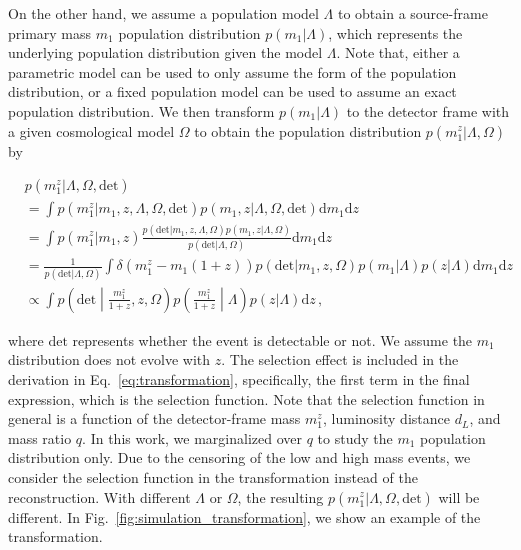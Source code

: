 \documentclass[twocolumn]{aastex631}
\begin{document}
On the other hand, we assume a population model $\Lambda$ to obtain a source-frame primary mass $m_1$ population distribution $p(m_1|\Lambda)$, which represents the underlying population distribution given the model $\Lambda$.
Note that, either a parametric model can be used to only assume the form of the population distribution, or a fixed population model can be used to assume an exact population distribution.
We then transform $p(m_1|\Lambda)$ to the detector frame with a given cosmological model $\Omega$ to obtain the population distribution $p(m^z_1|\Lambda, \Omega)$ by
\begin{widetext}
\begin{equation}
    \begin{aligned}
        &p(m^z_1|\Lambda, \Omega, \mathrm{det}) \\
        &= \int p(m^z_1|m_1, z, \Lambda, \Omega, \mathrm{det}) p(m_1, z|\Lambda, \Omega, \mathrm{det}) \mathrm{d}m_1 \mathrm{d}z \\
        &= \int p(m^z_1|m_1, z) \frac{p(\mathrm{det}|m_1, z, \Lambda, \Omega)p(m_1, z|\Lambda, \Omega)}{p(\mathrm{det}|\Lambda, \Omega)} \mathrm{d}m_1 \mathrm{d}z \\
        &= \frac{1}{p(\mathrm{det}|\Lambda, \Omega)}\int \delta(m^z_1-m_1(1+z))p(\mathrm{det}|m_1, z, \Omega)p(m_1|\Lambda)p(z|\Lambda) \mathrm{d}m_1 \mathrm{d}z \\
        &\propto \int p\left(\mathrm{det}\middle|\frac{m^z_1}{1+z},z,\Omega\right)p\left(\frac{m^z_1}{1+z}\middle|\Lambda\right)p(z|\Lambda) \mathrm{d}z\,,
    \end{aligned}
    \label{eq:transformation}
\end{equation}
\end{widetext}
where $\mathrm{det}$ represents whether the event is detectable or not.
We assume the $m_1$ distribution does not evolve with $z$.
The selection effect is included in the derivation in Eq.~\eqref{eq:transformation}, specifically, the first term in the final expression, which is the selection function.
Note that the selection function in general is a function of the detector-frame mass $m^z_1$, luminosity distance $d_L$, and mass ratio $q$.
In this work, we marginalized over $q$ to study the $m_1$ population distribution only.
Due to the censoring of the low and high mass events, we consider the selection function in the transformation instead of the reconstruction.
With different $\Lambda$ or $\Omega$, the resulting $p(m^z_1|\Lambda, \Omega, \mathrm{det})$ will be different.
In Fig.~\ref{fig:simulation_transformation}, we show an example of the transformation.
\end{document}
